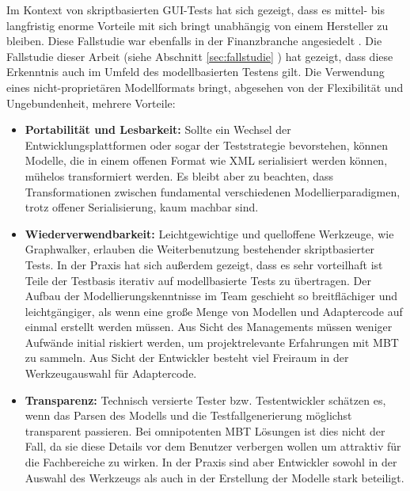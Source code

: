 Im Kontext von skriptbasierten GUI-Tests hat sich gezeigt, dass es mittel- bis langfristig enorme Vorteile mit sich bringt unabhängig von einem Hersteller zu bleiben. Diese Fallstudie war ebenfalls in der Finanzbranche angesiedelt \cite{graham_experiences_2012}. Die Fallstudie dieser Arbeit (siehe Abschnitt \ref{sec:fallstudie} ) hat gezeigt, dass diese Erkenntnis auch im Umfeld des modellbasierten Testens gilt. Die Verwendung eines nicht-proprietären Modellformats bringt, abgesehen von der Flexibilität und Ungebundenheit, mehrere Vorteile:

\begin{itemize}
\item \textbf{Portabilität und Lesbarkeit:} Sollte ein Wechsel der Entwicklungsplattformen oder sogar der Teststrategie bevorstehen, können Modelle, die in einem offenen Format wie XML serialisiert werden können, mühelos transformiert werden. Es bleibt aber zu beachten, dass Transformationen zwischen fundamental verschiedenen Modellierparadigmen, trotz offener Serialisierung, kaum machbar sind.
\item \textbf{Wiederverwendbarkeit:} Leichtgewichtige und quelloffene Werkzeuge, wie Graphwalker, erlauben die Weiterbenutzung bestehender skriptbasierter Tests. In der Praxis hat sich außerdem gezeigt, dass es sehr vorteilhaft ist Teile der Testbasis iterativ auf modellbasierte Tests zu übertragen. Der Aufbau der Modellierungskenntnisse im Team geschieht so breitflächiger und leichtgängiger, als wenn eine große Menge von Modellen und Adaptercode auf einmal erstellt werden müssen. Aus Sicht des Managements müssen weniger Aufwände initial riskiert werden, um projektrelevante Erfahrungen mit \Gls{MBT} zu sammeln. Aus Sicht der Entwickler besteht viel Freiraum in der Werkzeugauswahl für Adaptercode.
\item \textbf{Transparenz:} Technisch versierte Tester bzw. Testentwickler schätzen es, wenn das Parsen des Modells und die Testfallgenerierung möglichst transparent passieren. Bei omnipotenten \Gls{MBT} Lösungen ist dies nicht der Fall, da sie diese Details vor dem Benutzer verbergen wollen um attraktiv für die Fachbereiche zu wirken. In der Praxis sind aber Entwickler sowohl in der Auswahl des Werkzeugs als auch in der Erstellung der Modelle stark beteiligt.
\end{itemize}



